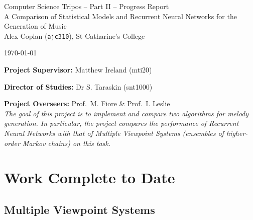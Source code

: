 \documentclass[12pt,a4paper,twoside]{article}
\begin{document}
\cleanlookdateon

\begin{center}
\Large
Computer Science Tripos -- Part II -- Progress Report\\[4mm]
\LARGE
A Comparison of Statistical Models and Recurrent Neural Networks for the
Generation of Music\\[4mm]

\large
Alex Coplan (\texttt{ajc310}), St Catharine's College


\today
\end{center}

\vspace{5mm}

\textbf{Project Supervisor:} Matthew Ireland (mti20)

\textbf{Director of Studies:} Dr S. Taraskin (snt1000)

\textbf{Project Overseers:} Prof.\ M. Fiore \& Prof.\ I. Leslie\\

\textit{The goal of this project is to implement and compare two algorithms for
melody generation. In particular, the project compares the performance of
Recurrent Neural Networks with that of Multiple Viewpoint Systems (ensembles of
higher-order Markov chains) on this task.}

\section*{Work Complete to Date}

\subsection*{Multiple Viewpoint Systems}
\end{document}
